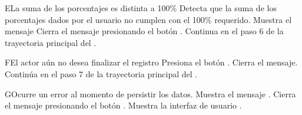 
\begin{UCtrayectoriaA}{E}{La suma de los porcentajes es distinta a 100\%}
    \UCpaso Detecta que la suma de los porcentajes dados por el usuario no cumplen con el 100\% requerido.
    \UCpaso Muestra el mensaje 
    \UCpaso[\UCactor] Cierra el mensaje presionando el botón .
    \UCpaso Continua en el paso 6 de la trayectoria principal del .
\end{UCtrayectoriaA}


\begin{UCtrayectoriaA}{F}{El actor aún no desea finalizar el registro}
	\UCpaso[\UCactor] Presiona el botón .
	\UCpaso Cierra el mensaje.
	\UCpaso Continúa en el paso 7 de la trayectoria principal del .
\end{UCtrayectoriaA}


\begin{UCtrayectoriaA}{G}{Ocurre un error al momento de persistir los datos.}
	\UCpaso Muestra el mensaje .
	\UCpaso[\UCactor] Cierra el mensaje presionando el botón .
	\UCpaso Muestra la interfaz de usuario .
\end{UCtrayectoriaA}